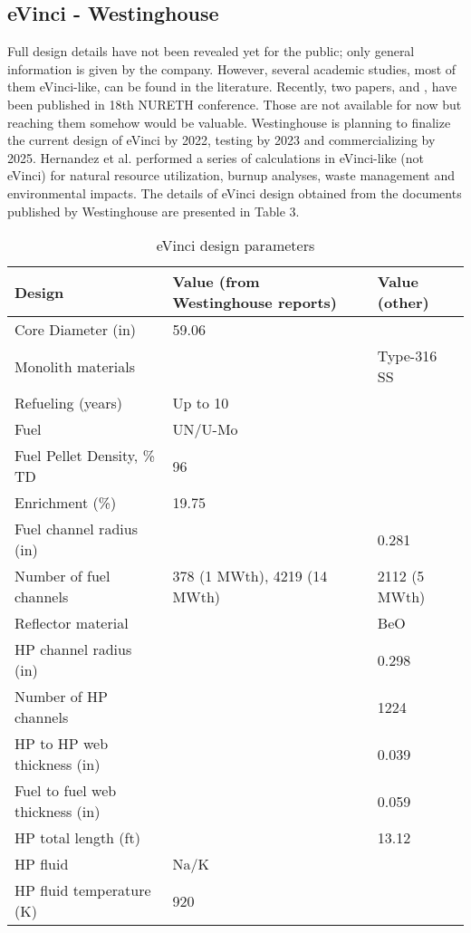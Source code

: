 \documentclass[10pt,a4paper]{article}
\begin{document}
\subsection{eVinci - Westinghouse}
Full design details have not been revealed yet for the public; only general information is given by the company. However, several academic studies, most of them eVinci-like, can be found in the literature. Recently, two papers, \cite{Xu19} and \cite{Wright19}, have been published in 18th NURETH conference. Those are not available for now but reaching them somehow would be valuable. Westinghouse is planning to finalize the current design of eVinci by 2022, testing by 2023 and commercializing by 2025. Hernandez et al. \cite{Hernandez19} performed a series of calculations in eVinci-like (not eVinci) for natural resource utilization, burnup analyses, waste management and environmental impacts. The details of eVinci design obtained from the documents published by Westinghouse are presented in Table 3. 

\begin{table} [ht]
\begin{center}

\caption{eVinci design parameters}
\begin{tabular}{|l|l|l|}
\hline 
Design 		&Value (from Westinghouse reports) 		& Value (other)\\ 
\hline 
Core Diameter (in) 		&59.06 		&  \\ 
\hline 
Monolith materials 		& 		& Type-316 SS	\\ 
\hline 
Refueling (years) 		&Up to 10 		&  \\ 
\hline 
Fuel 		&UN/U-Mo 		& 	 \\ 
\hline 
Fuel Pellet Density, \% TD 		&96 		&  \\ 
\hline 
Enrichment (\%) 		&19.75 		&  \\ 
\hline 
Fuel channel radius (in) 		& 		& 0.281 \\ 
\hline 
Number of fuel channels 		&378 (1 MWth), 4219 (14 MWth)		& 2112 (5 MWth) \\ 
\hline 
Reflector material 		&		& BeO\\ 
\hline 
HP channel radius (in) 		&		& 0.298\\ 
\hline 
Number of HP channels 		& 		& 1224\\ 
\hline 
HP to HP web thickness (in) 		& 		& 0.039\\ 
\hline 
Fuel to fuel web thickness (in) 		& 		& 0.059\\ 
\hline 
HP total length (ft) 		&		& 13.12\\ 
\hline 
HP fluid 		&Na/K		& \\ 
\hline 
HP fluid temperature (K) 		&920 		& \\ 
\hline

\end{tabular}
\end{center}
\end{table}
\end{document}
